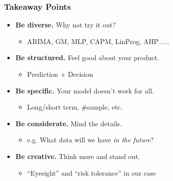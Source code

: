 \documentclass{beamer}
\begin{document}
\begin{frame}
    \frametitle{Takeaway Points}
    \begin{itemize}
        \item \textbf{Be diverse.} Why not try it out?
        \begin{itemize}
            \item ARIMA, GM, MLP, CAPM, LinProg, AHP......
        \end{itemize}
        \item \textbf{Be structured.} Feel good about your product.
        \begin{itemize}
            \item Prediction + Decision
        \end{itemize}
        \item \textbf{Be specific.} Your model doesn't work for all.
        \begin{itemize}
            \item Long/short term, \#sample, etc.
        \end{itemize}
        \item \textbf{Be considerate.} Mind the details.
        \begin{itemize}
            \item e.g. What data will we have \textit{in the future}?
        \end{itemize}
        \item \textbf{Be creative.} Think more and stand out.
        \begin{itemize}
            \item ``Eyesight'' and ``risk tolerance'' in our case
        \end{itemize}
    \end{itemize}
\end{frame}


\end{document}
